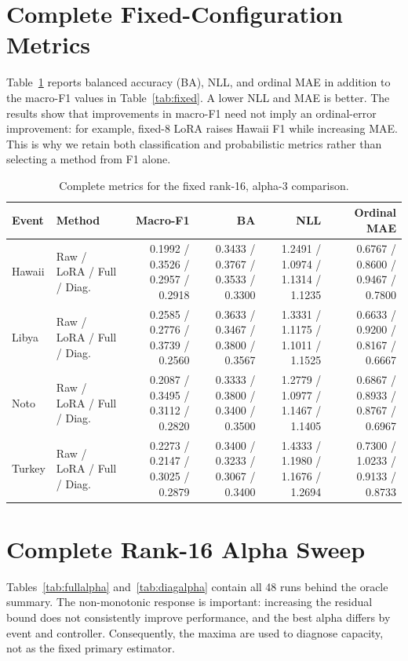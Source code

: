 \documentclass[conference]{IEEEtran}
\begin{document}
\appendices
\section{Complete Fixed-Configuration Metrics}
Table~\ref{tab:allmetrics} reports balanced accuracy (BA), NLL, and ordinal MAE
in addition to the macro-F1 values in Table~\ref{tab:fixed}. A lower NLL and MAE
is better. The results show that improvements in macro-F1 need not imply an
ordinal-error improvement: for example, fixed-8 LoRA raises Hawaii F1 while
increasing MAE. This is why we retain both classification and probabilistic
metrics rather than selecting a method from F1 alone.

\begin{table}[t]
\centering\scriptsize
\caption{Complete metrics for the fixed rank-16, alpha-3 comparison.}
\label{tab:allmetrics}
\begin{tabular}{llrrrr}
\toprule
Event & Method & Macro-F1 & BA & NLL & Ordinal MAE\\
\midrule
Hawaii & Raw / LoRA / Full / Diag.
& 0.1992 / 0.3526 / 0.2957 / 0.2918
& 0.3433 / 0.3767 / 0.3533 / 0.3300
& 1.2491 / 1.0974 / 1.1314 / 1.1235
& 0.6767 / 0.8600 / 0.9467 / 0.7800\\
Libya & Raw / LoRA / Full / Diag.
& 0.2585 / 0.2776 / 0.3739 / 0.2560
& 0.3633 / 0.3467 / 0.3800 / 0.3567
& 1.3331 / 1.1175 / 1.1011 / 1.1525
& 0.6633 / 0.9200 / 0.8167 / 0.6667\\
Noto & Raw / LoRA / Full / Diag.
& 0.2087 / 0.3495 / 0.3112 / 0.2820
& 0.3333 / 0.3800 / 0.3400 / 0.3500
& 1.2779 / 1.0977 / 1.1467 / 1.1405
& 0.6867 / 0.8933 / 0.8767 / 0.6967\\
Turkey & Raw / LoRA / Full / Diag.
& 0.2273 / 0.2147 / 0.3025 / 0.2879
& 0.3400 / 0.3233 / 0.3067 / 0.3400
& 1.4333 / 1.1980 / 1.1676 / 1.2694
& 0.7300 / 1.0233 / 0.9133 / 0.8733\\
\bottomrule
\end{tabular}
\end{table}

\section{Complete Rank-16 Alpha Sweep}
Tables~\ref{tab:fullalpha} and~\ref{tab:diagalpha} contain all 48 runs behind
the oracle summary. The non-monotonic response is important: increasing the
residual bound does not consistently improve performance, and the best alpha
differs by event and controller. Consequently, the maxima are used to diagnose
capacity, not as the fixed primary estimator.
\end{document}
